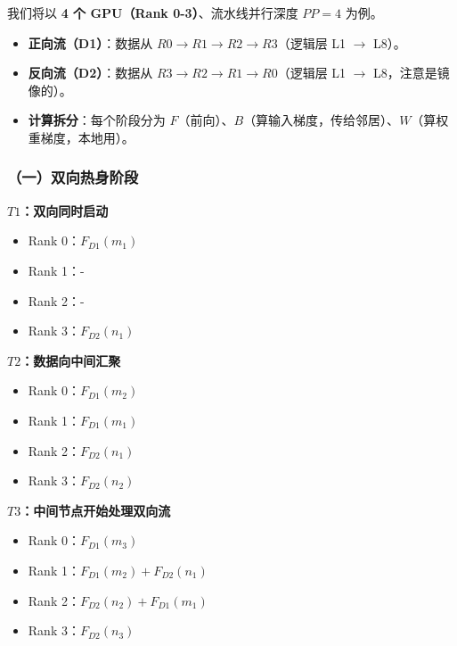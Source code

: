 我们将以 \textbf{4 个 GPU（Rank 0-3）}、流水线并行深度 \(PP = 4\) 为例。

\begin{itemize}
\tightlist
\item
  \textbf{正向流（D1）}：数据从 \(R0 \to R1 \to R2 \to R3\)（逻辑层 L1 \(\to\) L8）。
\item
  \textbf{反向流（D2）}：数据从 \(R3 \to R2 \to R1 \to R0\)（逻辑层 L1 \(\to\) L8，注意是镜像的）。
\item
  \textbf{计算拆分}：每个阶段分为 \(F\)（前向）、\(B\)（算输入梯度，传给邻居）、\(W\)（算权重梯度，本地用）。
\end{itemize}

\hypertarget{ux4e00ux53ccux5411ux70edux8eabux9636ux6bb5}{%
\subsubsection{（一）双向热身阶段}\label{ux4e00ux53ccux5411ux70edux8eabux9636ux6bb5}}

\textbf{\(T1\)：双向同时启动}

\begin{itemize}
\tightlist
\item
  Rank 0：\(F_{D1}(m_1)\)
\item
  Rank 1：-
\item
  Rank 2：-
\item
  Rank 3：\(F_{D2}(n_1)\)
\end{itemize}

\textbf{\(T2\)：数据向中间汇聚}

\begin{itemize}
\tightlist
\item
  Rank 0：\(F_{D1}(m_2)\)
\item
  Rank 1：\(F_{D1}(m_1)\)
\item
  Rank 2：\(F_{D2}(n_1)\)
\item
  Rank 3：\(F_{D2}(n_2)\)
\end{itemize}

\textbf{\(T3\)：中间节点开始处理双向流}

\begin{itemize}
\tightlist
\item
  Rank 0：\(F_{D1}(m_3)\)
\item
  Rank 1：\(F_{D1}(m_2)+F_{D2}(n_1)\)
\item
  Rank 2：\(F_{D2}(n_2)+F_{D1}(m_1)\)
\item
  Rank 3：\(F_{D2}(n_3)\)
\end{itemize}

